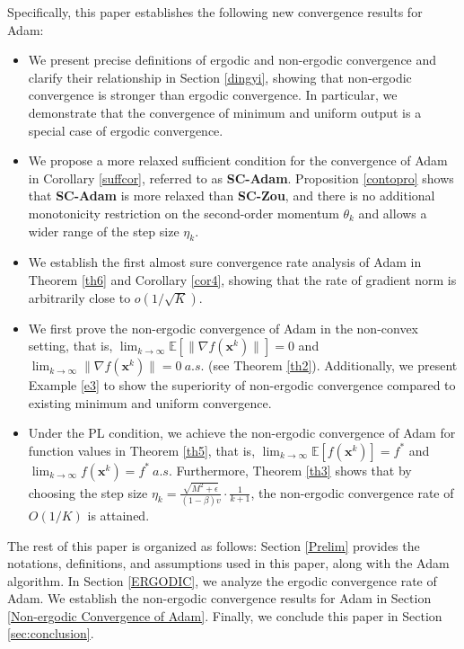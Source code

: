 \documentclass[twoside,11pt]{article}
\begin{document}
\par Specifically, this paper establishes the following new convergence results for Adam: 
\begin{itemize}
\item We present precise definitions of ergodic and non-ergodic convergence and clarify their relationship in Section \ref{dingyi}, showing that non-ergodic convergence is stronger than ergodic convergence. In particular, we demonstrate that the convergence of minimum and uniform output is a special case of ergodic convergence.
	
\item We propose a more relaxed sufficient condition for the convergence of Adam in Corollary \ref{suffcor}, referred to as \textbf{SC-Adam}. Proposition \ref{contopro} shows that \textbf{SC-Adam} is more relaxed than \textbf{SC-Zou}, and there is no additional monotonicity restriction on the second-order momentum $\theta_{k}$ and allows a wider range of the step size $\eta_{k}$.
		
\item We establish the first almost sure convergence rate analysis of Adam in Theorem \ref{th6} and Corollary \ref{cor4}, showing that the rate of gradient norm is arbitrarily close to $o(1/\sqrt{K})$.
	
\item We first prove the non-ergodic convergence of Adam in the non-convex setting, that is, $\lim_{k\rightarrow\infty} \mathbb{E}[\lVert \nabla f(\mathbf{x}^k)\rVert]=0$ and $\lim_{k\rightarrow\infty} \lVert\nabla f(\mathbf{x}^k)\rVert=0\ a.s.$ (see Theorem \ref{th2}). Additionally, we present Example \ref{e3} to show the superiority of non-ergodic convergence compared to existing minimum and uniform convergence.

\item Under the PL condition, we achieve the non-ergodic convergence of Adam for function values in Theorem \ref{th5}, that is, $\lim_{k\rightarrow\infty} \mathbb{E}[f(\mathbf{x}^k)]=f^*$ and $\lim_{k\rightarrow\infty} f(\mathbf{x}^k)=f^*\ a.s.$ Furthermore, Theorem \ref{th3} shows that by choosing the step size $\eta_k=\frac{\sqrt{M^2+\epsilon}}{(1-\beta)v}\cdot\frac{1}{k+1}$, the non-ergodic convergence rate of $O(1/K)$ is attained.
\end{itemize}
\par The rest of this paper is organized as follows: Section \ref{Prelim} provides the notations, definitions, and assumptions used in this paper, along with the Adam algorithm. In Section \ref{ERGODIC}, we analyze the ergodic convergence rate of Adam. We establish the non-ergodic convergence results for Adam in Section \ref{Non-ergodic Convergence of Adam}. Finally, we conclude this paper in Section \ref{sec:conclusion}.
\end{document}
